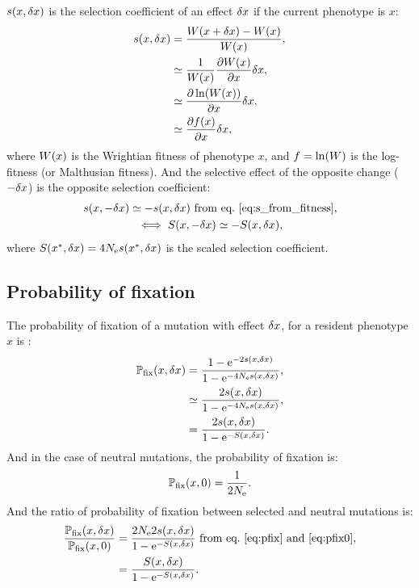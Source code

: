 $s(x, \delta x)$ is the selection coefficient of an effect $\delta x$ if the current phenotype is $x$:
\begin{align}
s(x, \delta x) &= \frac{ W (x + \delta x) - W (x)}{ W ( x)}, \\
 &\simeq \frac{1}{ W (x)}\frac{ \partial W (x) }{\partial x} \delta x, \\
 &\simeq \frac{ \partial \ln (W (x))}{\partial x} \delta x, \\
 &\simeq \frac{ \partial f (x) }{\partial x} \delta x, \label{eq:s_from_fitness}
\end{align}
where $ W ( x)$ is the Wrightian fitness of phenotype $x$, and $ f  = \ln (W)$ is the log-fitness (or Malthusian fitness).
And the selective effect of the opposite change ($-\delta x$) is the opposite selection coefficient:
\begin{gather}
s(x, -\delta x) \simeq - s(x, \delta x) \text{ from eq.~\ref{eq:s_from_fitness}} \label{eq:s_minus_deltax}, \\
\iff S(x, -\delta x) \simeq - S(x, \delta x), \label{eq:S_minus_deltax}
\end{gather}
where $S(x^{*}, \delta x) = 4N_{\mathrm{e}} s (x^{*}, \delta x)$ is the scaled selection coefficient.

\subsection{Probability of fixation}
\label{subsec:probability-of-fixation}

The probability of fixation of a mutation with effect $\delta x$, for a resident phenotype $x$ is :
\begin{align}
\mathbb{P}_{\mathrm{fix}}(x, \delta x) &= \frac{ 1 - \mathrm{e}^{-2 s(x, \delta x)}}{1 - \mathrm{e}^{-4N_{\mathrm{e}} s(x, \delta x)}}, \\
 &\simeq \frac{ 2 s(x, \delta x)}{1 - \mathrm{e}^{-4N_{\mathrm{e}} s(x, \delta x)}}, \\
 &= \frac{ 2 s(x, \delta x)}{1 - \mathrm{e}^{-S(x, \delta x)}}. \label{eq:pfix}
\end{align}
And in the case of neutral mutations, the probability of fixation is:
\begin{gather}
\mathbb{P}_{\mathrm{fix}}(x, 0) = \frac{ 1}{2 N_{\mathrm{e}}} \label{eq:pfix0}.
\end{gather}
And the ratio of probability of fixation between selected and neutral mutations is:
\begin{align}
\frac{\mathbb{P}_{\mathrm{fix}}(x, \delta x)}{\mathbb{P}_{\mathrm{fix}}(x, 0)} & = \frac{ 2 N_{\mathrm{e}} 2 s(x, \delta x)}{1 - \mathrm{e}^{-S(x, \delta x)}} \text{ from eq.~\ref{eq:pfix} and~\ref{eq:pfix0}},\\
& = \frac{S(x, \delta x)}{1 - \mathrm{e}^{-S(x, \delta x)}} \label{eq:pfixratio}.
\end{align}

